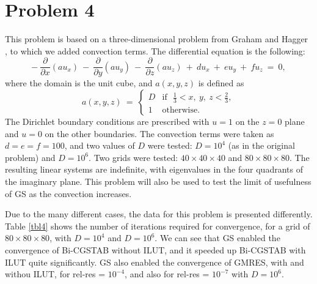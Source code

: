 \documentclass[12pt,a4paper]{article}
\newcounter{i}
\def\time{\!\times\!}
\begin{document}
\section{Problem 4}
\label{prob4}

This problem is based on a three-dimensional problem from Graham 
and Hagger \cite{Graham99}, to which we added convection terms.  
The differential equation is the following:
\[
 -~ \frac{\partial}{\partial x}(a u_x)
~-~ \frac{\partial}{\partial y}(a u_y) 
~-~ \frac{\partial}{\partial z}(a u_z) 
~+~ du_x ~+~ eu_y ~+~ fu_z ~=~ 0,
\]
where the domain is the unit cube, and $a(x,y,z)$ is defined as 
\[
a(x,y,z) ~=~ 
	 \left\{ \begin{array}{ll}
	 D & \mbox{if~~} \frac{1}{3} < x,~y,~z < \frac{2}{3}, \\[2pt]
	 1 & \mbox{otherwise.} 
		 \end{array} \right.
\]
The Dirichlet boundary conditions are prescribed with $u=1$ on the 
$z=0$ plane and $u=0$ on the other boundaries.  The convection terms 
were taken as $d=e=f=100$, and two values of $D$ were tested:
$D=10^4$ (as in the original problem) and $D=10^6$.  Two grids were
tested: $40\time40\time40$ and $80\time80\time80$.  The resulting 
linear systems are indefinite, with eigenvalues in the four quadrants 
of the imaginary plane.  This problem will also be used to test the
limit of usefulness of GS as the convection increases.

Due to the many different cases, the data for this problem is 
presented differently.
Table \ref{tbl4} shows the number of iterations required for 
convergence, for a grid of $80\time80\time80$, with $D=10^4$ 
and $D=10^6$.  We can see that GS enabled the convergence of 
Bi-CGSTAB without ILUT, and it speeded up Bi-CGSTAB with ILUT 
quite significantly.  GS also enabled the convergence of GMRES, 
with and withou ILUT, for rel-res = $10^{-4}$, and also for 
rel-res = $10^{-7}$ with $D=10^6$.
\end{document}
